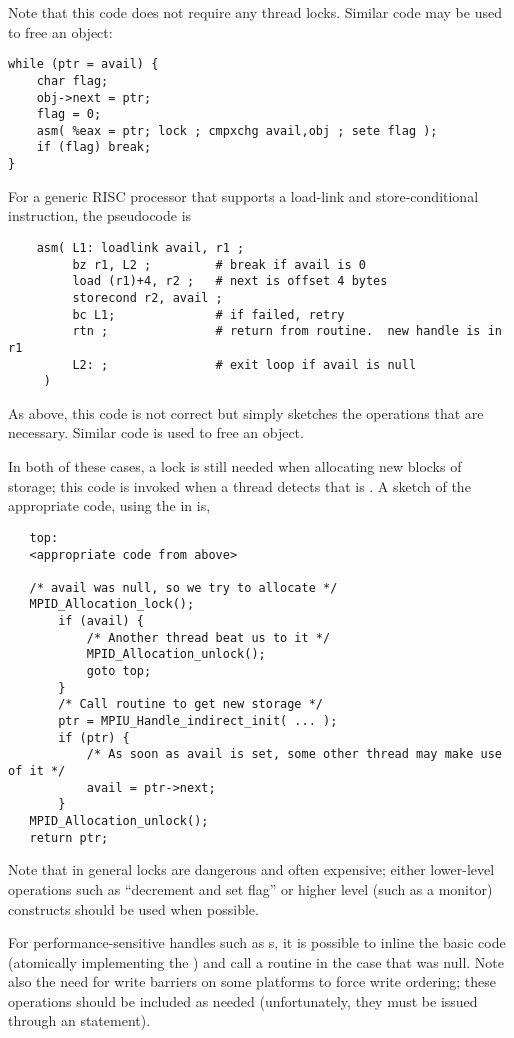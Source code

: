 \documentclass{article}
\begin{document}
Note that this code does not require any thread locks.  Similar code may be
used to free an object:
\begin{verbatim}
while (ptr = avail) {
    char flag;
    obj->next = ptr;
    flag = 0;
    asm( %eax = ptr; lock ; cmpxchg avail,obj ; sete flag );
    if (flag) break;
}
\end{verbatim}

For a generic RISC processor that supports a load-link and store-conditional
instruction, the pseudocode is
\begin{verbatim}
    asm( L1: loadlink avail, r1 ;
         bz r1, L2 ;         # break if avail is 0
         load (r1)+4, r2 ;   # next is offset 4 bytes
         storecond r2, avail ;
         bc L1;              # if failed, retry
         rtn ;               # return from routine.  new handle is in r1
         L2: ;               # exit loop if avail is null
     )
\end{verbatim}
As above, this  code is not correct but simply sketches the
operations that are necessary.  Similar code is used to free an object.

In both of these cases, a lock is still
needed when allocating new blocks of storage; this code is invoked when a
thread detects that  is .  A sketch of the appropriate
code, using the  in
 is, 
\begin{verbatim}
   top:
   <appropriate code from above>

   /* avail was null, so we try to allocate */
   MPID_Allocation_lock();
       if (avail) {
           /* Another thread beat us to it */
           MPID_Allocation_unlock();
           goto top;
       }   
       /* Call routine to get new storage */
       ptr = MPIU_Handle_indirect_init( ... );
       if (ptr) {
           /* As soon as avail is set, some other thread may make use of it */
           avail = ptr->next;
       }
   MPID_Allocation_unlock();
   return ptr;
\end{verbatim}
Note that in general locks are dangerous and often expensive; either
lower-level operations such as ``decrement and set flag'' or higher
level (such as a monitor) constructs should be used when possible.  

For performance-sensitive handles such as s, it is
possible to 
inline the basic code (atomically implementing the ) and call a routine in the case that 
was null.  Note also the need for write barriers on some platforms to
force write ordering; these operations should be included as needed
(unfortunately, they must be issued through an  statement).
\end{document}
